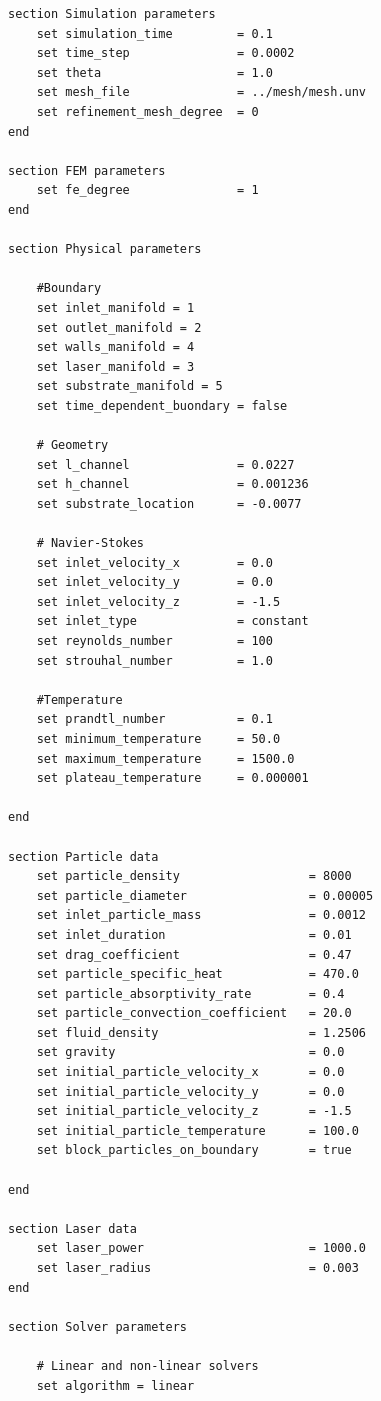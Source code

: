         \begin{verbatim}
section Simulation parameters
    set simulation_time         = 0.1
    set time_step               = 0.0002
    set theta                   = 1.0
    set mesh_file               = ../mesh/mesh.unv
    set refinement_mesh_degree  = 0
end

section FEM parameters
    set fe_degree               = 1
end

section Physical parameters

    #Boundary
    set inlet_manifold = 1
    set outlet_manifold = 2
    set walls_manifold = 4
    set laser_manifold = 3
    set substrate_manifold = 5
    set time_dependent_buondary = false

    # Geometry
    set l_channel               = 0.0227
    set h_channel               = 0.001236
    set substrate_location      = -0.0077

    # Navier-Stokes
    set inlet_velocity_x        = 0.0
    set inlet_velocity_y        = 0.0
    set inlet_velocity_z        = -1.5
    set inlet_type              = constant
    set reynolds_number         = 100
    set strouhal_number         = 1.0

    #Temperature
    set prandtl_number          = 0.1
    set minimum_temperature     = 50.0
    set maximum_temperature     = 1500.0
    set plateau_temperature     = 0.000001

end

section Particle data
    set particle_density                  = 8000
    set particle_diameter                 = 0.00005
    set inlet_particle_mass               = 0.0012
    set inlet_duration                    = 0.01
    set drag_coefficient                  = 0.47
    set particle_specific_heat            = 470.0
    set particle_absorptivity_rate        = 0.4
    set particle_convection_coefficient   = 20.0
    set fluid_density                     = 1.2506
    set gravity                           = 0.0
    set initial_particle_velocity_x       = 0.0
    set initial_particle_velocity_y       = 0.0
    set initial_particle_velocity_z       = -1.5
    set initial_particle_temperature      = 100.0
    set block_particles_on_boundary       = true

end

section Laser data
    set laser_power                       = 1000.0
    set laser_radius                      = 0.003
end

section Solver parameters

    # Linear and non-linear solvers
    set algorithm = linear


\end{verbatim}
